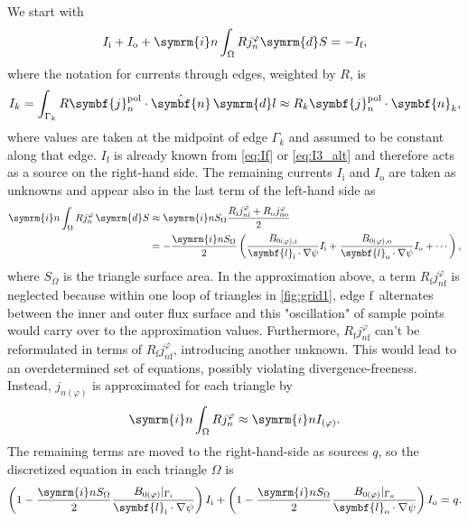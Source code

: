 \documentclass[a4paper, 10pt, english]{article}
\let\temp\vartheta
\let\vartheta\theta
\let\theta\temp
\let\temp\varphi
\let\varphi\phi
\let\phi\temp
\let\vec\symbf
\newcommand*\diff{\ensuremath{\symrm{d}}}  %
\newcommand*\im{\ensuremath{\symrm{i}}}  %
\newcommand*\pol{\ensuremath{\textrm{pol}}}  %
\newcommand*\fs{\ensuremath{\textrm{f}}}  %
\newcommand*\inw{\ensuremath{\textrm{i}}}  %
\newcommand*\out{\ensuremath{\textrm{o}}}  %
\begin{document}
We start with
\begin{gather}
  I_{\inw} + I_{\out} + \im n \int_{\Omega} R j_{n}^{\phi} \diff S = -I_{\fs},
\end{gather}
where the notation for currents through edges, weighted by $R$, is
\begin{gather}
  I_{k} = \int_{\Gamma_{k}} R \vec{j}_{n}^{\pol} \cdot \hat{\vec{n}} \, \diff l \approx R_{k} \vec{j}_{n}^{\pol} \cdot \vec{n}_{k},
\end{gather}
where values are taken at the midpoint of edge $\Gamma_{k}$ and assumed to be constant along that edge. $I_{\fs}$ is already known from \cref{eq:If} or \cref{eq:I3_alt}
and therefore acts as a source on the right-hand side. The remaining currents $I_{\inw}$ and $I_{\out}$ are taken as unknowns and appear also in the last term of the left-hand side as
\begin{align}
  \im n \int_{\Omega} R j_{n}^{\phi} \, \diff S & \approx \im n S_{\Omega} \frac{R_{\inw} j_{n \inw}^{\phi} + R_{\out} j_{n \out}^{\phi}}{2} \nonumber \\
  &= -\frac{\im n S_{\Omega}}{2} \left( \frac{B_{0 (\phi), \inw}}{\vec{l}_{\inw} \cdot \nabla \psi} I_{\inw} + \frac{B_{0 (\phi), \out}}{\vec{l}_{\out} \cdot \nabla \psi} I_{\out} + \dotsb \right),
\end{align}
where $S_{\Omega}$ is the triangle surface area. In the approximation above, a term $R_{\fs} j_{n \fs}^{\phi}$ is neglected because within one loop of triangles in \cref{fig:grid1}, edge \fs\ alternates between the inner and outer flux surface and this "oscillation" of sample points would carry over to the approximation values. Furthermore, $R_{\fs} j_{n \fs}^{\phi}$ can't be reformulated in terms of $R_{\fs} j_{n \fs}^{\phi}$, introducing another unknown. This would lead to an overdetermined set of equations, possibly violating divergence-freeness. Instead, $j_{n (\phi)}$ is approximated for each triangle by
\begin{gather}
  \im n \int_{\Omega} R j_{n}^{\phi} \approx \im n I_{(\phi)}.
\end{gather}
The remaining terms are moved to the right-hand-side as sources $q$, so the discretized equation in each triangle $\Omega$ is
\begin{gather}
  \left( 1 - \frac{\im n S_{\Omega}}{2} \frac{B_{0 (\phi)} \vert_{\Gamma_{\inw}}}{\vec{l}_{\inw} \cdot \nabla \psi} \right) I_{\inw} + \left( 1 - \frac{\im n S_{\Omega}}{2} \frac{B_{0 (\phi)} \vert_{\Gamma_{\out}}}{\vec{l}_{\out} \cdot \nabla \psi} \right) I_{\out} = q. \label{eq:Ii-Io}
\end{gather}
\end{document}
